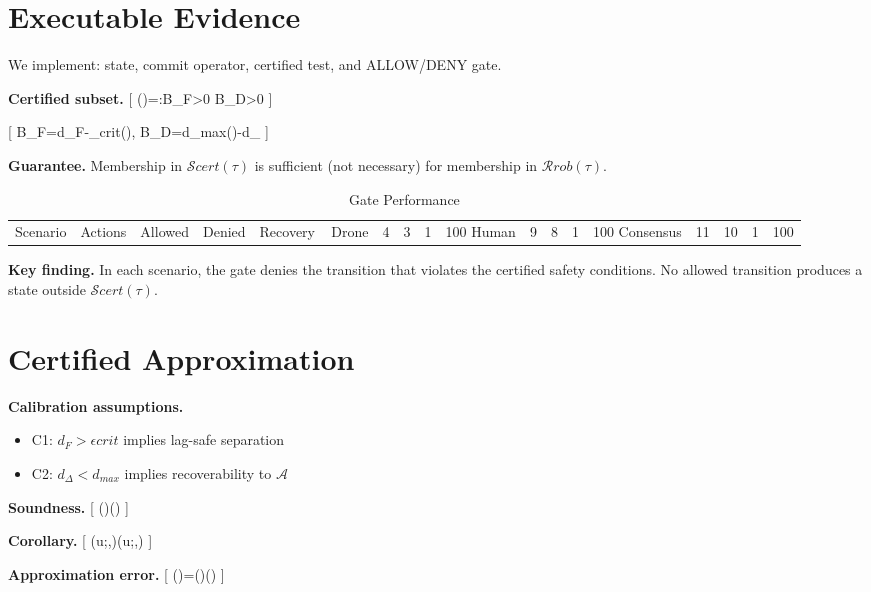 \documentclass{article}
\begin{document}
\section{Executable Evidence}

We implement: state, commit operator, certified test, and ALLOW/DENY gate.

\textbf{Certified subset.}
[
(\tau)={:B_F>0 \wedge B_D>0}
]

[
B_F=d_F-\epsilon_{crit}(\tau), \quad
B_D=d_{max}(\tau)-d_\Delta
]

\textbf{Guarantee.}
Membership in $\mathcal{S}{cert}(\tau)$ is sufficient (not necessary) for membership in $\mathcal{R}{rob}(\tau)$.

\begin{table}[h]
\centering
\caption{Gate Performance}
\begin{tabular}{lcccc}
Scenario & Actions & Allowed & Denied & Recovery \
\hline
Drone & 4 & 3 & 1 & 100%
Human & 9 & 8 & 1 & 100%
Consensus & 11 & 10 & 1 & 100%
\end{tabular}
\end{table}

\textbf{Key finding.}
In each scenario, the gate denies the transition that violates the certified safety conditions. No allowed transition produces a state outside $\mathcal{S}{cert}(\tau)$.

\section{Certified Approximation}

\textbf{Calibration assumptions.}
\begin{itemize}
    \item C1: $d_F>\epsilon{crit}$ implies lag-safe separation
    \item C2: $d_\Delta<d_{max}$ implies recoverability to $\mathcal{A}$
\end{itemize}

\textbf{Soundness.}
[
(\tau)\subseteq{}(\tau)
]

\textbf{Corollary.}
[
(u;,\tau)\Rightarrow{}(u;,\tau)
]

\textbf{Approximation error.}
[
(\tau)=(\tau)\setminus{}(\tau)
]

\end{document}
